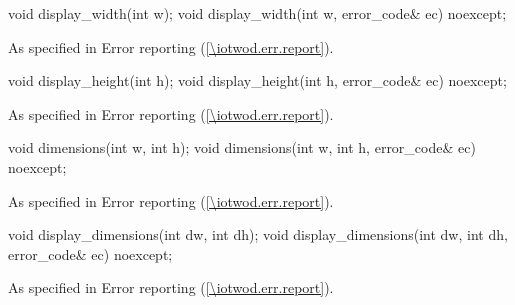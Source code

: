 \begin{itemdecl}
void display_width(int w);
void display_width(int w, error_code& ec) noexcept;
\end{itemdecl}
\begin{itemdescr}
\pnum
\effects

\pnum
\postconditions

\pnum
\throws
As specified in Error reporting (\ref{\iotwod.err.report}).

\pnum
\errors
\end{itemdescr}

\begin{itemdecl}
void display_height(int h);
void display_height(int h, error_code& ec) noexcept;
\end{itemdecl}
\begin{itemdescr}
\pnum
\effects

\pnum
\postconditions

\pnum
\throws
As specified in Error reporting (\ref{\iotwod.err.report}).

\pnum
\errors
\end{itemdescr}

\begin{itemdecl}
void dimensions(int w, int h);
void dimensions(int w, int h, error_code& ec) noexcept;
\end{itemdecl}
\begin{itemdescr}
\pnum
\effects

\pnum
\postconditions

\pnum
\throws
As specified in Error reporting (\ref{\iotwod.err.report}).

\pnum
\errors
\end{itemdescr}

\begin{itemdecl}
void display_dimensions(int dw, int dh);
void display_dimensions(int dw, int dh, error_code& ec) noexcept;
\end{itemdecl}
\begin{itemdescr}
\pnum
\effects

\pnum
\postconditions

\pnum
\throws
As specified in Error reporting (\ref{\iotwod.err.report}).

\pnum
\errors
\end{itemdescr}

